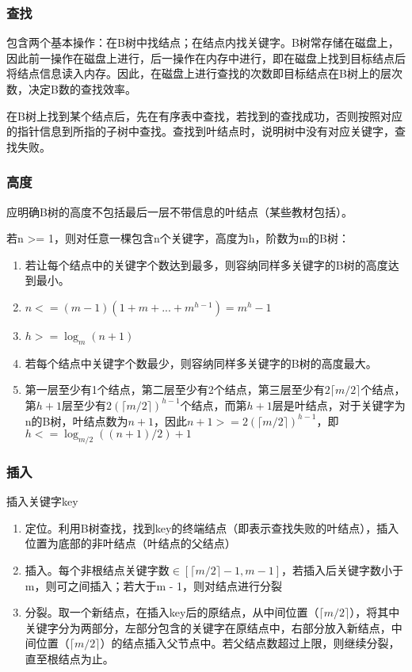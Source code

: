 \subsubsection{查找}
包含两个基本操作：在B树中找结点；在结点内找关键字。B树常存储在磁盘上，因此前一操作在磁盘上进行，后一操作在内存中进行，即在磁盘上找到目标结点后将结点信息读入内存。因此，在磁盘上进行查找的次数即目标结点在B树上的层次数，决定B数的查找效率。

在B树上找到某个结点后，先在有序表中查找，若找到的查找成功，否则按照对应的指针信息到所指的子树中查找。查找到叶结点时，说明树中没有对应关键字，查找失败。


\subsubsection{高度}
应明确B树的高度不包括最后一层不带信息的叶结点（某些教材包括）。

若n >= 1，则对任意一棵包含n个关键字，高度为h，阶数为m的B树：
\begin{enumerate}
    \item 若让每个结点中的关键字个数达到最多，则容纳同样多关键字的B树的高度达到最小。
    \item \(n <= (m - 1)(1 + m + ... + m^{h - 1}) = m^h - 1\)
    \item \(h >= \log_m(n + 1)\)
    \item 若每个结点中关键字个数最少，则容纳同样多关键字的B树的高度最大。
    \item 第一层至少有1个结点，第二层至少有2个结点，第三层至少有\(2\lceil m / 2\rceil\)个结点，第\(h + 1\)层至少有\(2(\lceil m / 2\rceil)^{h - 1}\)个结点，而第\(h + 1\)层是叶结点，对于关键字为n的B树，叶结点数为\(n + 1\)，因此\(n + 1 >= 2(\lceil m / 2\rceil)^{h - 1}\)，即\(h <= \log_{m / 2}((n + 1) / 2) + 1\)
\end{enumerate}


\subsubsection{插入}
插入关键字key
\begin{enumerate}
    \item 定位。利用B树查找，找到key的终端结点（即表示查找失败的叶结点），插入位置为底部的非叶结点（叶结点的父结点）
    \item 插入。每个非根结点关键字数\(\in [\lceil m / 2\rceil - 1, m - 1]\)，若插入后关键字数小于m，则可之间插入；若大于m - 1，则对结点进行分裂
    \item 分裂。取一个新结点，在插入key后的原结点，从中间位置（\(\lceil m / 2\rceil\)），将其中关键字分为两部分，左部分包含的关键字在原结点中，右部分放入新结点，中间位置（\(\lceil m / 2\rceil\)）的结点插入父节点中。若父结点数超过上限，则继续分裂，直至根结点为止。
\end{enumerate}


